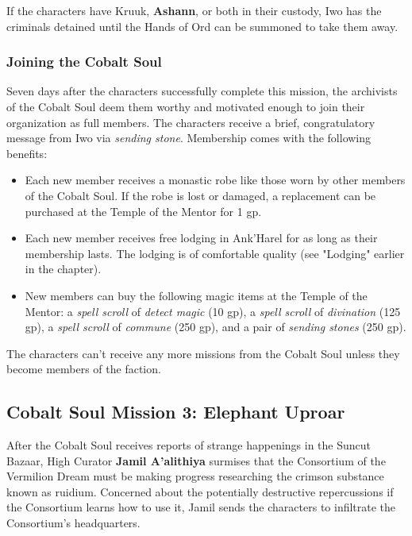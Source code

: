 \documentclass[a4paper, 11pt, bg=full, twocolumn, nooutline]{dndbook}
\begin{document}
If the characters have Kruuk, \textbf{Ashann}, or both in their custody, Iwo has the criminals detained until the Hands of Ord can be summoned to take them away.

\subsubsection{Joining the Cobalt Soul}

Seven days after the characters successfully complete this mission, the archivists of the Cobalt Soul deem them worthy and motivated enough to join their organization as full members. The characters receive a brief, congratulatory message from Iwo via \textit{sending stone}. Membership comes with the following benefits:

\begin{itemize}
\item Each new member receives a monastic robe like those worn by other members of the Cobalt Soul. If the robe is lost or damaged, a replacement can be purchased at the Temple of the Mentor for 1 gp.
\item Each new member receives free lodging in Ank'Harel for as long as their membership lasts. The lodging is of comfortable quality (see "Lodging" earlier in the chapter).
\item New members can buy the following magic items at the Temple of the Mentor: a \textit{spell scroll} of \textit{detect magic} (10 gp), a \textit{spell scroll} of \textit{divination} (125 gp), a \textit{spell scroll} of \textit{commune} (250 gp), and a pair of \textit{sending stones} (250 gp).
\end{itemize}

The characters can't receive any more missions from the Cobalt Soul unless they become members of the faction.

\subsection{Cobalt Soul Mission 3: Elephant Uproar}

After the Cobalt Soul receives reports of strange happenings in the Suncut Bazaar, High Curator \textbf{Jamil A'alithiya} surmises that the Consortium of the Vermilion Dream must be making progress researching the crimson substance known as ruidium. Concerned about the potentially destructive repercussions if the Consortium learns how to use it, Jamil sends the characters to infiltrate the Consortium's headquarters.
\end{document}
